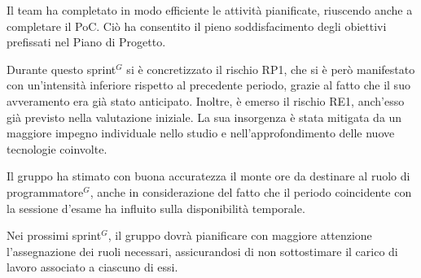 Il team ha completato in modo efficiente le attività pianificate, riuscendo anche a completare il PoC. Ciò ha consentito il pieno soddisfacimento degli obiettivi prefissati nel Piano di Progetto.

Durante questo sprint$^G$ si è concretizzato il rischio RP1, che si è però manifestato con un'intensità inferiore rispetto al precedente periodo, grazie al fatto che il suo avveramento era già stato anticipato.
Inoltre, è emerso il rischio RE1, anch'esso già previsto nella valutazione iniziale. La sua insorgenza è stata mitigata da un maggiore impegno individuale nello studio e nell'approfondimento delle nuove tecnologie coinvolte.

Il gruppo ha stimato con buona accuratezza il monte ore da destinare al ruolo di programmatore$^G$, anche in considerazione del fatto che il periodo coincidente con la sessione d'esame ha influito sulla disponibilità temporale.

Nei prossimi sprint$^G$, il gruppo dovrà pianificare con maggiore attenzione l'assegnazione dei ruoli necessari, assicurandosi di non sottostimare il carico di lavoro associato a ciascuno di essi.

